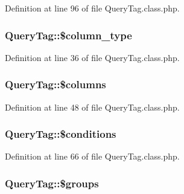 Definition at line 96 of file Query\+Tag.\+class.\+php.

\subsubsection[{\texorpdfstring{\$column\+\_\+type}{$column_type}}]{\setlength{\rightskip}{0pt plus 5cm}Query\+Tag\+::\$column\+\_\+type}\hypertarget{classQueryTag_a617db2d7a2db9fddba0959b43cc40458}{}\label{classQueryTag_a617db2d7a2db9fddba0959b43cc40458}


Definition at line 36 of file Query\+Tag.\+class.\+php.

\subsubsection[{\texorpdfstring{\$columns}{$columns}}]{\setlength{\rightskip}{0pt plus 5cm}Query\+Tag\+::\$columns}\hypertarget{classQueryTag_a375d57839b60d616ed27af9f42acd3a1}{}\label{classQueryTag_a375d57839b60d616ed27af9f42acd3a1}


Definition at line 48 of file Query\+Tag.\+class.\+php.

\subsubsection[{\texorpdfstring{\$conditions}{$conditions}}]{\setlength{\rightskip}{0pt plus 5cm}Query\+Tag\+::\$conditions}\hypertarget{classQueryTag_a7cf9adc98dec4da0e67c1dcd25b7e5b5}{}\label{classQueryTag_a7cf9adc98dec4da0e67c1dcd25b7e5b5}


Definition at line 66 of file Query\+Tag.\+class.\+php.

\subsubsection[{\texorpdfstring{\$groups}{$groups}}]{\setlength{\rightskip}{0pt plus 5cm}Query\+Tag\+::\$groups}\hypertarget{classQueryTag_aa456465c5358ae400751727cd943683e}{}\label{classQueryTag_aa456465c5358ae400751727cd943683e}


